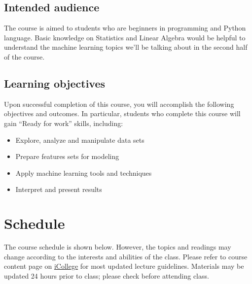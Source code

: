 \documentclass{article}
\begin{document}
\subsection{Intended audience}
The course is aimed to students who are beginners in programming and Python language. Basic knowledge on Statistics and Linear Algebra would be helpful to understand the machine learning topics we'll be talking about in the second half of the course.


\subsection{Learning objectives}
Upon successful completion of this course, you will accomplish the following objectives and outcomes. In particular, students who complete this course will gain “Ready for work” skills, including:\\
\begin{itemize}
  \item Explore, analyze and manipulate data sets
  \item Prepare features sets for modeling
  \item Apply machine learning tools and techniques
  \item Interpret and present results
\end{itemize}


\section{Schedule}
The course schedule is shown below. However, the topics and readings may change according to the interests and abilities of the class. Please refer to course content page on \href{https://gastate.view.usg.edu/d2l/home/2822689}{iCollege} for most updated lecture guidelines.  Materials may be updated 24 hours prior to class; please check before attending class.
\end{document}

